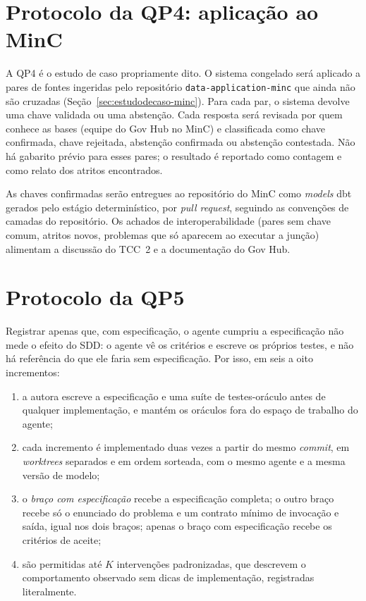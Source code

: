\section{Protocolo da QP4: aplicação ao MinC}
\label{sec:metodologia-protocolo-qp4}

A QP4 é o estudo de caso propriamente dito. O sistema congelado será
aplicado a pares de fontes ingeridas pelo repositório
\texttt{data-application-minc} que ainda não são cruzadas
(Seção~\ref{sec:estudodecaso-minc}). Para cada par, o sistema devolve uma
chave validada ou uma abstenção. Cada resposta será revisada por quem conhece
as bases (equipe do Gov Hub no MinC) e classificada como chave confirmada,
chave rejeitada, abstenção confirmada ou abstenção contestada. Não há
gabarito prévio para esses pares; o resultado é reportado como contagem e
como relato dos atritos encontrados.

As chaves confirmadas serão entregues ao repositório do MinC como
\emph{models} dbt gerados pelo estágio determinístico, por \emph{pull
request}, seguindo as convenções de camadas do repositório. Os achados de
interoperabilidade (pares sem chave comum, atritos novos, problemas que só
aparecem ao executar a junção) alimentam a discussão do TCC~2 e a
documentação do Gov Hub.

\section{Protocolo da QP5}
\label{sec:metodologia-protocolo-de-avaliacao}

Registrar apenas que, com especificação, o agente cumpriu a especificação não
mede o efeito do SDD: o agente vê os critérios e escreve os próprios testes,
e não há referência do que ele faria sem especificação. Por isso, em seis a
oito incrementos:

\begin{enumerate}
\item a autora escreve a especificação e uma suíte de testes-oráculo antes de
qualquer implementação, e mantém os oráculos fora do espaço de trabalho do
agente;
\item cada incremento é implementado duas vezes a partir do mesmo
\emph{commit}, em \emph{worktrees} separados e em ordem sorteada, com o mesmo
agente e a mesma versão de modelo;
\item o \emph{braço com especificação} recebe a especificação completa; o
outro braço recebe só o enunciado do problema e um contrato mínimo de
invocação e saída, igual nos dois braços; apenas o braço com especificação
recebe os critérios de aceite;
\item são permitidas até $K$ intervenções padronizadas, que descrevem o
comportamento observado sem dicas de implementação, registradas literalmente.
\end{enumerate}


